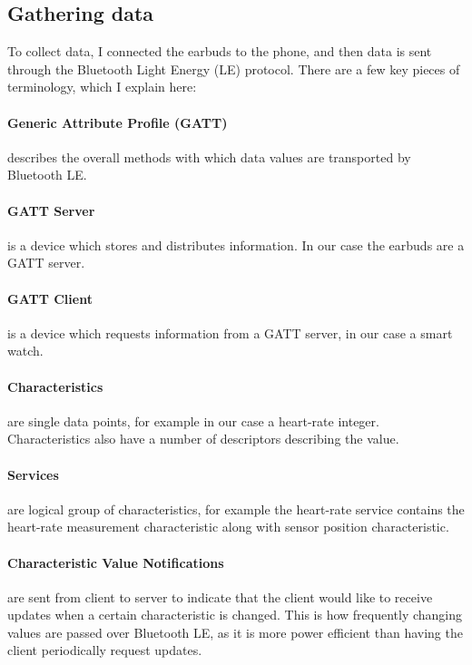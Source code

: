 \documentclass[12pt,a4paper,twoside,openright]{report}
\begin{document}
\subsection{Gathering data}

To collect data, I connected the earbuds to the phone, and then data is
sent through the Bluetooth Light Energy (LE) protocol. There are a few key
pieces of terminology, which I explain here:

\paragraph{Generic Attribute Profile (GATT)} describes the overall methods
with which data values are transported by Bluetooth LE.

\paragraph{GATT Server} is a device which stores and distributes information. In
our case the earbuds are a GATT server.

\paragraph{GATT Client} is a device which requests information from a GATT
server, in our case a smart watch.

\paragraph{Characteristics} are single data points, for example in our case a
heart-rate integer. Characteristics also have a number of descriptors
describing the value.

\paragraph{Services} are logical group of characteristics, for example the
heart-rate service contains the heart-rate measurement characteristic along
with sensor position characteristic.

\paragraph{Characteristic Value Notifications} are sent from client to server
to indicate that the client would like to receive updates when a certain
characteristic is changed. This is how frequently changing values are passed
over Bluetooth LE, as it is more power efficient than having the client
periodically request updates.
\\
\\
\end{document}
